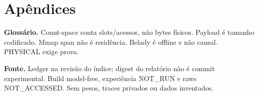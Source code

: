 \section{Apêndices}
\textbf{Glossário.} Count-space conta slots/acessos, não bytes físicos. Payload é tamanho codificado. Mmap span não é residência. Belady é offline e não causal. PHYSICAL exige prova.

\textbf{Fonte.} Ledger na revisão do índice; digest do relatório não é commit experimental. Build model-free, experiência NOT\_RUN e raws NOT\_ACCESSED. Sem pesos, traces privados ou dados inventados.
